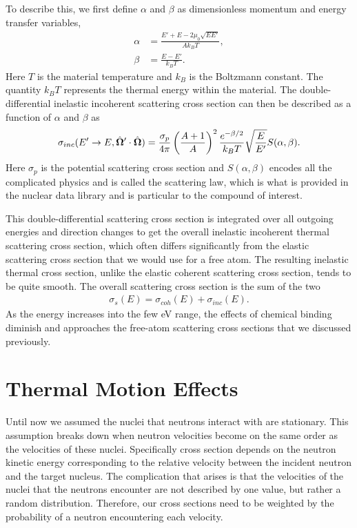To describe this, we first define $\alpha$ and $\beta$ as dimensionless momentum and energy transfer variables,
\begin{subequations}
\begin{align}
  \alpha &= \frac{ E' + E - 2 \mu_0 \sqrt{ E E' } }{ A k_B T }, \\
  \beta  &= \frac{ E - E' }{ k_B T } .
\end{align}
\end{subequations} 
Here $T$ is the material temperature and $k_B$ is the Boltzmann constant. The quantity $k_B T$ represents the thermal energy within the material. The double-differential inelastic incoherent scattering cross section can then be described as a function of $\alpha$ and $\beta$ as
\begin{align} \label{Eq:nuclearData_generalDDXS_Salphabeta}
  \sigma_{inc}(E' \rightarrow E, \hat{\mathbf{\Omega}}' \cdot \hat{\mathbf{\Omega}} ) = \frac{ \sigma_p }{ 4\pi } \left( \frac{ A + 1 }{ A } \right)^2 \frac{ e^{-\beta/2} }{ k_B T } \sqrt{\frac{E}{E'}} S(\alpha,\beta) .
\end{align}
Here $\sigma_p$ is the potential scattering cross section and $S(\alpha,\beta)$ encodes all the complicated physics and is called the scattering law, which is what is provided in the nuclear data library and is particular to the compound of interest. 

This double-differential scattering cross section is integrated over all outgoing energies and direction changes to get the overall inelastic incoherent thermal scattering cross section, which often differs significantly from the elastic scattering cross section that we would use for a free atom. The resulting inelastic thermal cross section, unlike the elastic coherent scattering cross section, tends to be quite smooth. The overall scattering cross section is the sum of the two
\begin{align}
  \sigma_s(E) = \sigma_{coh}(E) + \sigma_{inc}(E).
\end{align}
As the energy increases into the few eV range, the effects of chemical binding diminish and approaches the free-atom scattering cross sections that we discussed previously. 

\section{Thermal Motion Effects}

Until now we assumed the nuclei that neutrons interact with are stationary. This assumption breaks down when neutron velocities become on the same order as the velocities of these nuclei. Specifically cross section depends on the neutron kinetic energy corresponding to the relative velocity between the incident neutron and the target nucleus. The complication that arises is that the velocities of the nuclei that the neutrons encounter are not described by one value, but rather a random distribution. Therefore, our cross sections need to be weighted by the probability of a neutron encountering each velocity.

